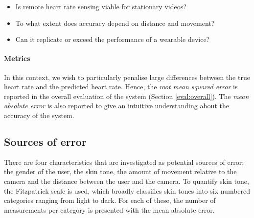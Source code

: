 % 
\begin{itemize}
    \item Is remote heart rate sensing viable for stationary videos?
    \item To what extent does accuracy depend on distance and movement?
    \item Can it replicate or exceed the performance of a wearable device?
\end{itemize}

\paragraph{Metrics}
In this context, we wish to particularly penalise large differences between the true heart rate and the predicted heart rate.
Hence, the \textit{root mean squared error} is reported in the overall evaluation of the system (Section \ref{eval:overall}). 
The \textit{mean absolute error} is also reported to give an intuitive understanding about the accuracy of the system.


\subsection{Sources of error}
There are four characteristics that are investigated as potential sources of error: the gender of the user, the skin tone, the amount of movement
relative to the camera and the distance between the user and the camera.
To quantify skin tone, the Fitzpatrick scale \cite{Fitzpatrick} is used, which broadly classifies skin tones into six numbered categories ranging from light to dark.
For each of these, the number of measurements per category is presented with the mean absolute error. 

